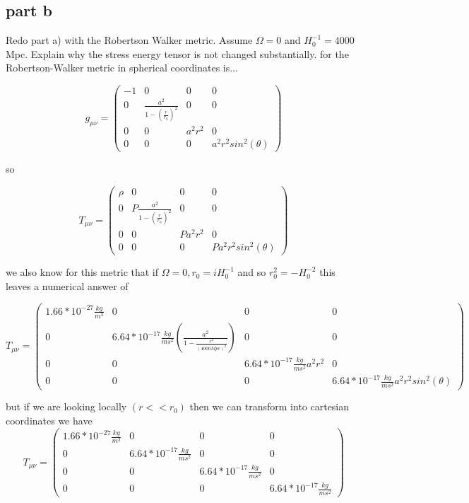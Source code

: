 \documentclass{article}
\begin{document}
\subsection{part b}
Redo part a) with the Robertson Walker metric. Assume $\Omega=0$ and $H_{0}^{-1}=4000$ Mpc. Explain why the stress energy tensor is not changed substantially. 
for the Robertson-Walker metric in spherical coordinates is...

\[ g_{\mu\nu} = \left( \begin{array}{cccc}
-1 & 0 & 0 & 0 \\
0 & \frac{a^{2}}{1-(\frac{r}{r_{0}})^{2}} & 0 & 0 \\
0 & 0 & a^{2}r^{2} & 0 \\
0 & 0 & 0 & a^{2}r^{2}sin^{2}(\theta) \end{array} \right)\] 

so 

\[ T_{\mu\nu} = \left( \begin{array}{cccc}
\rho & 0 & 0 & 0 \\
0 & P\frac{a^{2}}{1-(\frac{r}{r_{0}})^{2}} & 0 & 0 \\
0 & 0 & Pa^{2}r^{2} & 0 \\
0 & 0 & 0 & Pa^{2}r^{2}sin^{2}(\theta) \end{array} \right)\] 

we also know for this metric that if $\Omega=0, r_{0}=iH_{0}^{-1}$ and so $r_{0}^{2}=-H_{0}^{-2}$
this leaves a numerical answer of 

\large
\[ T_{\mu\nu} = \left( \begin{array}{cccc}
1.66*10^{-27}\frac{kg}{m^{3}} & 0 & 0 & 0 \\
0 & 6.64*10^{-17}\frac{kg}{ms^{2}}(\frac{a^{2}}{1-\frac{r^{2}}{(4000 Mpc)^{2}}}) & 0 & 0 \\
0 & 0 & 6.64*10^{-17}\frac{kg}{ms^{2}}a^{2}r^{2} & 0 \\
0 & 0 & 0 & 6.64*10^{-17}\frac{kg}{ms^{2}}a^{2}r^{2}sin^{2}(\theta) \end{array} \right)\] 
\Large

but if we are looking locally $(r<<r_{0})$ then we can transform into cartesian coordinates we have 
\[ T_{\mu\nu} = \left( \begin{array}{cccc}
1.66*10^{-27}\frac{kg}{m^{3}} & 0 & 0 & 0 \\
0 & 6.64*10^{-17}\frac{kg}{ms^{2}} & 0 & 0 \\
0 & 0 & 6.64*10^{-17}\frac{kg}{ms^{2}} & 0 \\
0 & 0 & 0 & 6.64*10^{-17}\frac{kg}{ms^{2}} \end{array} \right)\] 
\end{document}
